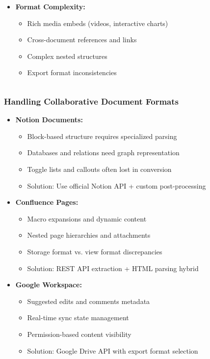 \begin{frame}[fragile]
\begin{columns}
\begin{column}[T]{0.5\linewidth}
\begin{itemize}
        \item \textbf{Format Complexity:}
        \begin{itemize}
            \item Rich media embeds (videos, interactive charts)
            \item Cross-document references and links
            \item Complex nested structures
            \item Export format inconsistencies
        \end{itemize}
      \end{itemize}
    \end{column}
\end{columns}
\end{frame}

\begin{frame}[fragile]\frametitle{Handling Collaborative Document Formats}
      \begin{itemize}
        \item \textbf{Notion Documents:}
        \begin{itemize}
            \item Block-based structure requires specialized parsing
            \item Databases and relations need graph representation
            \item Toggle lists and callouts often lost in conversion
            \item Solution: Use official Notion API + custom post-processing
        \end{itemize}
        \item \textbf{Confluence Pages:}
        \begin{itemize}
            \item Macro expansions and dynamic content
            \item Nested page hierarchies and attachments
            \item Storage format vs. view format discrepancies
            \item Solution: REST API extraction + HTML parsing hybrid
        \end{itemize}
        \item \textbf{Google Workspace:}
        \begin{itemize}
            \item Suggested edits and comments metadata
            \item Real-time sync state management
            \item Permission-based content visibility
            \item Solution: Google Drive API with export format selection
        \end{itemize}
      \end{itemize}
\end{frame}


